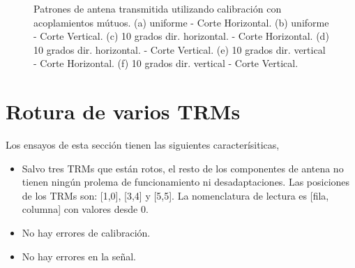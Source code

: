 \begin{figure}[H]
		\caption{Patrones de antena transmitida utilizando calibración con acoplamientos mútuos. (a) uniforme - Corte Horizontal.
			(b) uniforme - Corte Vertical. (c) 10 grados dir. horizontal. - Corte Horizontal. (d) 10 grados dir. horizontal. - Corte 
			Vertical. (e) 10 grados dir. vertical - Corte Horizontal. (f) 10 grados dir. vertical - Corte Vertical.}
	\label{fig:nonErrorMutualPat}
\end{figure}



\section{Rotura de varios TRMs}

Los ensayos de esta sección tienen las siguientes caracterísiticas,
\begin{itemize}
	\item Salvo tres TRMs que están rotos, el resto de los componentes de antena no tienen ningún prolema de funcionamiento ni 
		desadaptaciones. Las posiciones de los TRMs son: [1,0], [3,4] y [5,5]. La nomenclatura de lectura es [fila, columna] con 
		valores desde 0.
	\item No hay errores de calibración.
	\item No hay errores en la señal.
\end{itemize}

